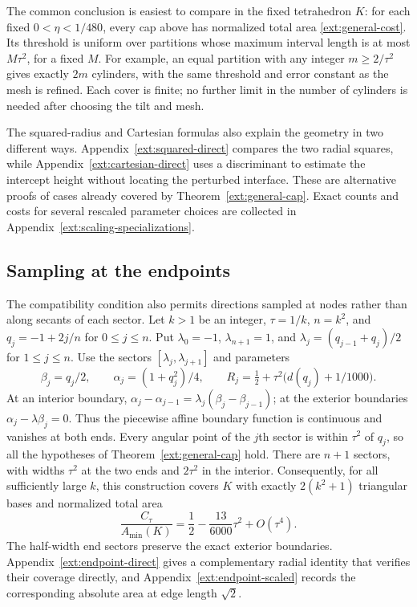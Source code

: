 The common conclusion is easiest to compare in the fixed tetrahedron $K$:
for each fixed $0<\eta<1/480$, every cap above has normalized total area
\eqref{ext:general-cost}.  Its threshold is uniform over partitions whose
maximum interval length is at most $M\tau^2$, for a fixed $M$.
For example, an equal partition with any integer $m\ge2/\tau^2$ gives
exactly $2m$ cylinders, with the same threshold and error constant as the
mesh is refined.  Each cover is finite; no further limit in the number
of cylinders is needed after choosing the tilt and mesh.

The squared-radius and Cartesian formulas also explain the geometry in
two different ways.  Appendix~\ref{ext:squared-direct} compares the two
radial squares, while Appendix~\ref{ext:cartesian-direct} uses a
discriminant to estimate the intercept height without locating the
perturbed interface.  These are alternative proofs of cases already
covered by Theorem~\ref{ext:general-cap}.  Exact counts and costs for
several rescaled parameter choices are collected in
Appendix~\ref{ext:scaling-specializations}.

\subsection{Sampling at the endpoints}
\label{ext:endpoint-sectors}

The compatibility condition also permits directions sampled at nodes
rather than along secants of each sector.  Let $k>1$ be an integer,
$\tau=1/k$, $n=k^2$, and $q_j=-1+2j/n$ for $0\le j\le n$.
Put $\lambda_0=-1$, $\lambda_{n+1}=1$, and
$\lambda_j=(q_{j-1}+q_j)/2$ for $1\le j\le n$.
Use the sectors $[\lambda_j,\lambda_{j+1}]$ and parameters
\[
 \beta_j=q_j/2,\qquad \alpha_j=(1+q_j^2)/4,\qquad
 R_j=\tfrac12+\tau^2\bigl(d(q_j)+1/1000\bigr).
\]
At an interior boundary,
$\alpha_j-\alpha_{j-1}=\lambda_j(\beta_j-\beta_{j-1})$;
at the exterior boundaries $\alpha_j-\lambda\beta_j=0$.
Thus the piecewise affine boundary function is continuous and vanishes
at both ends.  Every angular point of the $j$th sector is within $\tau^2$
of $q_j$, so all the hypotheses of Theorem~\ref{ext:general-cap} hold.
There are $n+1$ sectors, with widths $\tau^2$ at the two ends and
$2\tau^2$ in the interior.  Consequently, for all sufficiently large $k$,
this construction covers $K$ with exactly $2(k^2+1)$ triangular bases
and normalized total area
\begin{equation}\label{ext:endpoint-cost}
 \frac{C_\tau}{A_{\min}(K)}
 =\frac12-\frac{13}{6000}\tau^2+O(\tau^4).
\end{equation}
The half-width end sectors preserve the exact exterior boundaries.
Appendix~\ref{ext:endpoint-direct} gives a complementary radial identity
that verifies their coverage directly, and
Appendix~\ref{ext:endpoint-scaled} records the corresponding absolute
area at edge length $\sqrt2$.

